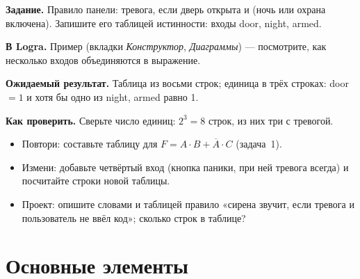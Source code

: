 \begin{diybox}
\textbf{Задание.} Правило панели: тревога, если дверь открыта и (ночь или
охрана включена). Запишите его таблицей истинности: входы door, night, armed.\par
\textbf{В Logra.} Пример  (вкладки \emph{Конструктор},
\emph{Диаграммы}) --- посмотрите, как несколько входов объединяются в
выражение.\par
\textbf{Ожидаемый результат.} Таблица из восьми строк; единица в трёх
строках: door${}=1$ и хотя бы одно из night, armed равно 1.\par
\textbf{Как проверить.} Сверьте число единиц: $2^3=8$ строк, из них три с
тревогой.
\begin{itemize}[leftmargin=3.4em,labelwidth=3em,labelsep=0.4em,align=left]
  \item[\stars{1}] Повтори: составьте таблицу для $F = A\cdot B + \overline{A}\cdot C$
    (задача~1).
  \item[\stars{2}] Измени: добавьте четвёртый вход (кнопка паники, при ней тревога
    всегда) и посчитайте строки новой таблицы.
  \item[\stars{3}] Проект: опишите словами и таблицей правило «сирена звучит, если
    тревога и пользователь не ввёл код»; сколько строк в таблице?
\end{itemize}
\end{diybox}

\section{Основные элементы}

\newcommand{\gaterow}[5]{%
  \begin{tikzpicture}[baseline=-1mm]
    \node[#1] (g) at (0,0) {};
    \ifstrequal{#1}{gNOT}{\draw[wire] (g.input) -- ++(-0.35,0);}{%
      \draw[wire] (g.input 1) -- ++(-0.35,0); \draw[wire] (g.input 2) -- ++(-0.35,0);}
    \draw[wire] (g.output) -- ++(0.35,0);
  \end{tikzpicture} &
  \begin{tikzpicture}[baseline=-1mm]
    \node[#2] (h) at (0,0) {};
    \ifstrequal{#2}{iNOT}{\draw[wire] (h.input) -- ++(-0.35,0);}{%
      \draw[wire] (h.input 1) -- ++(-0.35,0); \draw[wire] (h.input 2) -- ++(-0.35,0);}
    \draw[wire] (h.output) -- ++(0.35,0);
  \end{tikzpicture} & #3 & #4 & #5 \\[6mm]}

